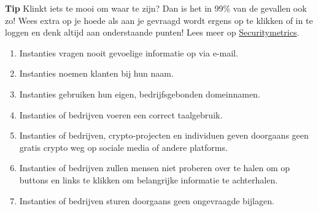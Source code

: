 \begin{tipbox}{\textbf{Tip}}
    Klinkt iets te mooi om waar te zijn? Dan is het in 99\% van de gevallen ook zo! Wees extra op je hoede als aan je gevraagd wordt ergens op te klikken of in te loggen en denk altijd aan onderstaande punten!
    \tcblower
    Lees meer op \href{https://www.securitymetrics.com/blog/7-ways-recognize-phishing-email}{Securitymetrics}.
\end{tipbox}
\medskip

\begin{enumerate}[label=(\alph*)]
  \setlength\itemsep{0em}
    \item Instanties vragen nooit gevoelige informatie op via e-mail.
    \item Instanties noemen klanten bij hun naam.
    \item Instanties gebruiken hun eigen, bedrijfsgebonden domeinnamen.
    \item Instanties of bedrijven voeren een correct taalgebruik.
    \item Instanties of bedrijven, crypto-projecten en individuen geven doorgaans geen gratis crypto weg op sociale media of andere platforms.
    \item Instanties of bedrijven zullen mensen niet proberen over te halen om op buttons en links te klikken om belangrijke informatie te achterhalen.
    \item Instanties of bedrijven sturen doorgaans geen ongevraagde bijlagen.
\end{enumerate}



